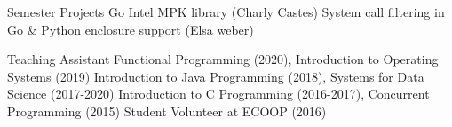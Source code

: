 


\begin{cvskills}

\cvskill
{Semester Projects}
{
  Go Intel MPK library (Charly Castes)\linebreak
  System call filtering in Go \& Python enclosure support (Elsa weber)\linebreak
}

\cvskill
{Teaching Assistant} %
{
  Functional Programming (2020), Introduction to Operating Systems (2019)\linebreak
  Introduction to Java Programming (2018), Systems for Data Science (2017-2020)\linebreak
  Introduction to C Programming (2016-2017), Concurrent Programming (2015)\linebreak
	Student Volunteer at ECOOP (2016)
}

\end{cvskills}
